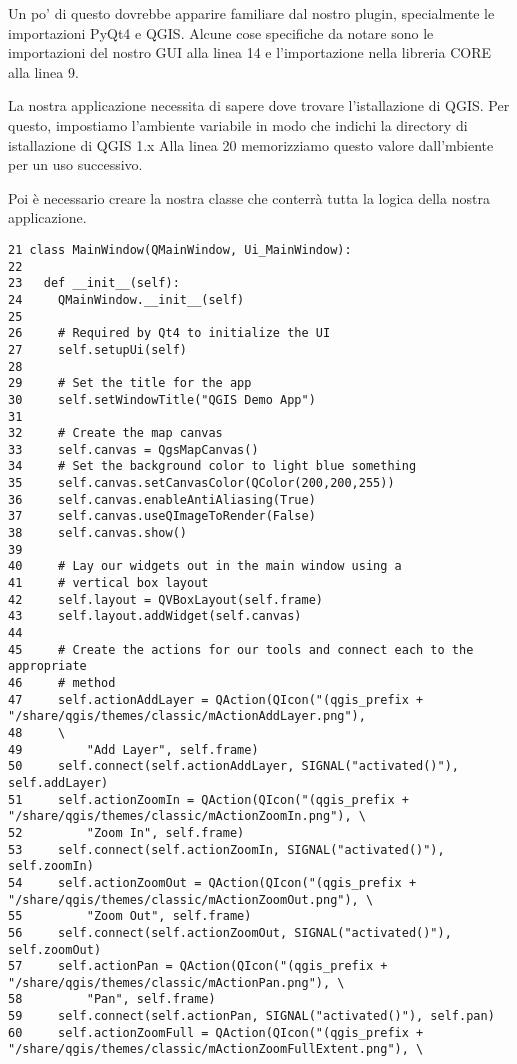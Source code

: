 Un po' di questo dovrebbe apparire familiare dal nostro plugin, specialmente le importazioni PyQt4 e
QGIS. Alcune cose specifiche da notare sono le importazioni del nostro GUI alla linea
14 e l'importazione nella libreria CORE alla linea 9.

La nostra applicazione necessita di sapere dove trovare l'istallazione di QGIS. Per questo, impostiamo l'ambiente variabile  in modo che indichi la directory di istallazione di QGIS 1.x Alla linea 20 memorizziamo questo valore dall'mbiente per un uso successivo.

Poi è necessario creare la nostra classe  che conterrà tutta la logica della nostra applicazione.
\begin{verbatim}
21 class MainWindow(QMainWindow, Ui_MainWindow):
22 
23   def __init__(self):
24     QMainWindow.__init__(self)
25 
26     # Required by Qt4 to initialize the UI
27     self.setupUi(self)
28 
29     # Set the title for the app
30     self.setWindowTitle("QGIS Demo App")
31 
32     # Create the map canvas
33     self.canvas = QgsMapCanvas()
34     # Set the background color to light blue something
35     self.canvas.setCanvasColor(QColor(200,200,255))
36     self.canvas.enableAntiAliasing(True)
37     self.canvas.useQImageToRender(False)
38     self.canvas.show()
39 
40     # Lay our widgets out in the main window using a 
41     # vertical box layout
42     self.layout = QVBoxLayout(self.frame)
43     self.layout.addWidget(self.canvas)
44 
45     # Create the actions for our tools and connect each to the appropriate
46     # method
47     self.actionAddLayer = QAction(QIcon("(qgis_prefix + "/share/qgis/themes/classic/mActionAddLayer.png"),
48     \
49         "Add Layer", self.frame)
50     self.connect(self.actionAddLayer, SIGNAL("activated()"), self.addLayer)
51     self.actionZoomIn = QAction(QIcon("(qgis_prefix + "/share/qgis/themes/classic/mActionZoomIn.png"), \
52         "Zoom In", self.frame)
53     self.connect(self.actionZoomIn, SIGNAL("activated()"), self.zoomIn)
54     self.actionZoomOut = QAction(QIcon("(qgis_prefix + "/share/qgis/themes/classic/mActionZoomOut.png"), \
55         "Zoom Out", self.frame)
56     self.connect(self.actionZoomOut, SIGNAL("activated()"), self.zoomOut)
57     self.actionPan = QAction(QIcon("(qgis_prefix + "/share/qgis/themes/classic/mActionPan.png"), \
58         "Pan", self.frame)
59     self.connect(self.actionPan, SIGNAL("activated()"), self.pan)
60     self.actionZoomFull = QAction(QIcon("(qgis_prefix + "/share/qgis/themes/classic/mActionZoomFullExtent.png"), \

\end{verbatim}

